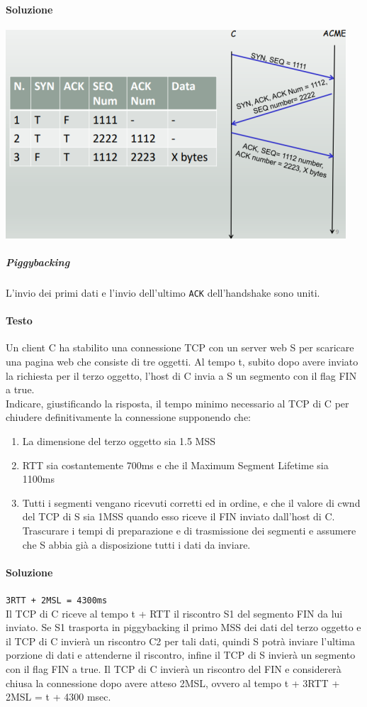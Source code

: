 \documentclass[10pt]{article}
\begin{document}
\paragraph{Soluzione}
\begin{center}
\includegraphics[scale=1]{es_tcp1.png}
\end{center}
\subparagraph{Piggybacking} L'invio dei primi dati e l'invio dell'ultimo \texttt{ACK} dell'handshake sono uniti.
\paragraph{Testo} Un client C ha stabilito una connessione TCP con un server web S per scaricare una pagina web che consiste di tre oggetti. Al tempo t, subito dopo avere inviato la richiesta per il terzo oggetto, l’host di C invia a S un segmento con il flag FIN a true.\\
Indicare, giustificando la risposta, il tempo minimo necessario al TCP di C per chiudere definitivamente la connessione supponendo che:
\begin{enumerate}
\item La dimensione del terzo oggetto sia 1.5 MSS
\item RTT sia costantemente 700ms e che il Maximum Segment Lifetime sia 1100ms
\item Tutti i segmenti vengano ricevuti corretti ed in ordine, e che il valore di cwnd del TCP di S sia 1MSS quando esso riceve il FIN inviato dall’host di C. Trascurare i tempi di preparazione e di trasmissione dei segmenti e assumere che S abbia già a disposizione tutti i dati da inviare.
\end{enumerate}
\paragraph{Soluzione} \texttt{3RTT + 2MSL = 4300ms}\\
Il TCP di C riceve al tempo t + RTT il riscontro S1 del segmento FIN da lui inviato. Se S1 trasporta in piggybacking il primo MSS dei dati del terzo oggetto e il TCP di C invierà un riscontro C2 per tali dati, quindi S potrà inviare l’ultima porzione di dati e attenderne il riscontro, infine il TCP di S invierà un segmento con il flag FIN a true. Il TCP di C invierà un riscontro del FIN e considererà chiusa la connessione dopo avere atteso 2MSL, ovvero al tempo t + 3RTT + 2MSL = t + 4300 msec.
\pagebreak
\end{document}
